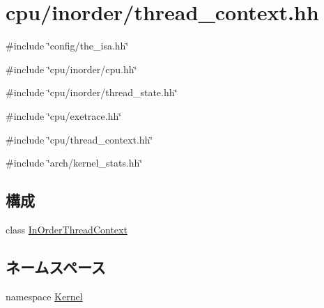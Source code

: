 \hypertarget{inorder_2thread__context_8hh}{
\section{cpu/inorder/thread\_\-context.hh}
\label{inorder_2thread__context_8hh}
}
{\ttfamily \#include \char`\"{}config/the\_\-isa.hh\char`\"{}}\par
{\ttfamily \#include \char`\"{}cpu/inorder/cpu.hh\char`\"{}}\par
{\ttfamily \#include \char`\"{}cpu/inorder/thread\_\-state.hh\char`\"{}}\par
{\ttfamily \#include \char`\"{}cpu/exetrace.hh\char`\"{}}\par
{\ttfamily \#include \char`\"{}cpu/thread\_\-context.hh\char`\"{}}\par
{\ttfamily \#include \char`\"{}arch/kernel\_\-stats.hh\char`\"{}}\par
\subsection*{構成}
\begin{DoxyCompactItemize}
\item 
class \hyperlink{classInOrderThreadContext}{InOrderThreadContext}
\end{DoxyCompactItemize}
\subsection*{ネームスペース}
\begin{DoxyCompactItemize}
\item 
namespace \hyperlink{namespaceKernel}{Kernel}
\end{DoxyCompactItemize}
